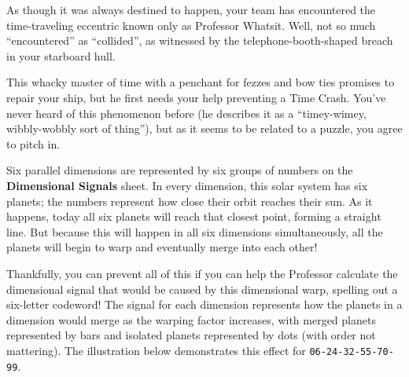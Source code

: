 As though it was always destined to happen, your team has encountered
the time-traveling eccentric known only as Professor Whatsit. Well, not
so much ``encountered'' as ``collided'', as witnessed by the 
telephone-booth-shaped breach in your starboard hull.

This whacky master of time with a penchant for fezzes and bow ties promises to
repair your ship, but he first needs your help preventing a
Time Crash. You've never heard of this phenomenon before (he describes it as a
``timey-wimey, wibbly-wobbly sort of thing''), but as it seems to be 
related to a puzzle, you agree to pitch in.

Six parallel dimensions are represented by six groups of numbers on
the \textbf{Dimensional Signals} sheet. In every dimension, this solar system
has six planets; the numbers represent how close their orbit reaches their sun.
As it happens, today all six planets will reach that closest
point, forming a straight line. But because this will happen
in all six dimensions simultaneously, all the planets will begin
to warp and eventually merge into each other!
%

Thankfully, you can prevent all of this if you can help the Professor
calculate the dimensional signal that would be caused by this dimensional
warp, spelling out a six-letter codeword!
The signal for each dimension represents how
the planets in a dimension would merge as the warping factor increases,
with merged planets represented by bars and isolated planets represented
by dots (with order not mattering). 
The illustration below demonstrates this effect for \texttt{06-24-32-55-70-99}.

